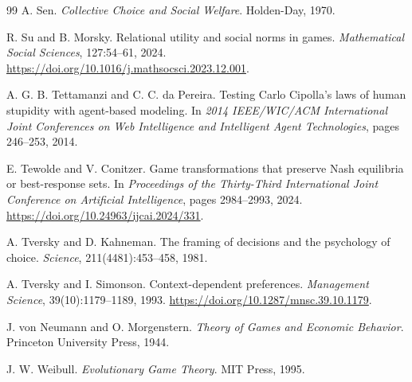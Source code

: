 \documentclass[a4paper,fleqn]{cas-dc}
\theoremstyle{remark}
\begin{document}
\begin{thebibliography}{99}
A. Sen.
\emph{Collective Choice and Social Welfare}.
Holden-Day, 1970.

R. Su and B. Morsky.
Relational utility and social norms in games.
\emph{Mathematical Social Sciences}, 127:54--61, 2024.
\url{https://doi.org/10.1016/j.mathsocsci.2023.12.001}.

A. G. B. Tettamanzi and C. C. da Pereira.
Testing Carlo Cipolla's laws of human stupidity with agent-based modeling.
In \emph{2014 IEEE/WIC/ACM International Joint Conferences on Web Intelligence and Intelligent Agent Technologies}, pages 246--253, 2014.

E. Tewolde and V. Conitzer.
Game transformations that preserve Nash equilibria or best-response sets.
In \emph{Proceedings of the Thirty-Third International Joint Conference on
Artificial Intelligence}, pages 2984--2993, 2024.
\url{https://doi.org/10.24963/ijcai.2024/331}.

A. Tversky and D. Kahneman.
The framing of decisions and the psychology of choice.
\emph{Science}, 211(4481):453--458, 1981.

A. Tversky and I. Simonson.
Context-dependent preferences.
\emph{Management Science}, 39(10):1179--1189, 1993.
\url{https://doi.org/10.1287/mnsc.39.10.1179}.

J. von Neumann and O. Morgenstern.
\emph{Theory of Games and Economic Behavior}.
Princeton University Press, 1944.

J. W. Weibull.
\emph{Evolutionary Game Theory}.
MIT Press, 1995.

\end{thebibliography}
\end{document}
